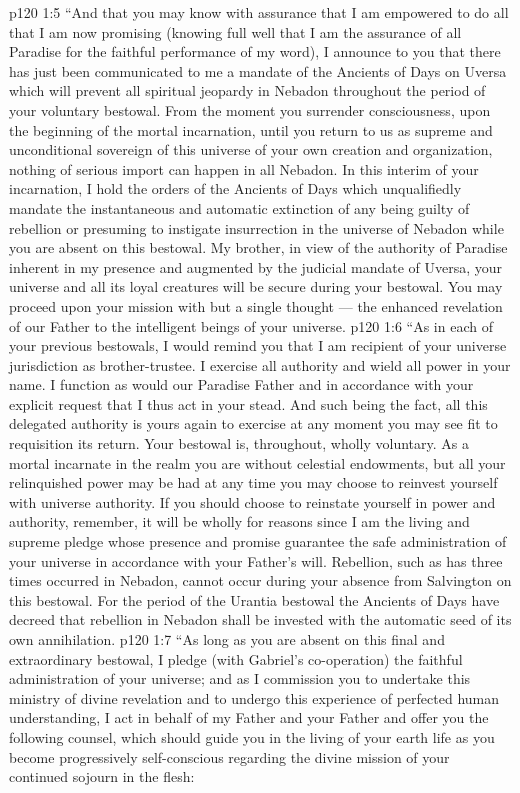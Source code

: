 \vs p120 1:5 “And that you may know with assurance that I am empowered to do all that I am now promising (knowing full well that I am the assurance of all Paradise for the faithful performance of my word), I announce to you that there has just been communicated to me a mandate of the Ancients of Days on Uversa which will prevent all spiritual jeopardy in Nebadon throughout the period of your voluntary bestowal. From the moment you surrender consciousness, upon the beginning of the mortal incarnation, until you return to us as supreme and unconditional sovereign of this universe of your own creation and organization, nothing of serious import can happen in all Nebadon. In this interim of your incarnation, I hold the orders of the Ancients of Days which unqualifiedly mandate the instantaneous and automatic extinction of any being guilty of rebellion or presuming to instigate insurrection in the universe of Nebadon while you are absent on this bestowal. My brother, in view of the authority of Paradise inherent in my presence and augmented by the judicial mandate of Uversa, your universe and all its loyal creatures will be secure during your bestowal. You may proceed upon your mission with but a single thought --- the enhanced revelation of our Father to the intelligent beings of your universe.
\vs p120 1:6 “As in each of your previous bestowals, I would remind you that I am recipient of your universe jurisdiction as brother\hyp{}trustee. I exercise all authority and wield all power in your name. I function as would our Paradise Father and in accordance with your explicit request that I thus act in your stead. And such being the fact, all this delegated authority is yours again to exercise at any moment you may see fit to requisition its return. Your bestowal is, throughout, wholly voluntary. As a mortal incarnate in the realm you are without celestial endowments, but all your relinquished power may be had at any time you may choose to reinvest yourself with universe authority. If you should choose to reinstate yourself in power and authority, remember, it will be wholly for  reasons since I am the living and supreme pledge whose presence and promise guarantee the safe administration of your universe in accordance with your Father’s will. Rebellion, such as has three times occurred in Nebadon, cannot occur during your absence from Salvington on this bestowal. For the period of the Urantia bestowal the Ancients of Days have decreed that rebellion in Nebadon shall be invested with the automatic seed of its own annihilation.
\vs p120 1:7 “As long as you are absent on this final and extraordinary bestowal, I pledge (with Gabriel’s co\hyp{}operation) the faithful administration of your universe; and as I commission you to undertake this ministry of divine revelation and to undergo this experience of perfected human understanding, I act in behalf of my Father and your Father and offer you the following counsel, which should guide you in the living of your earth life as you become progressively self\hyp{}conscious regarding the divine mission of your continued sojourn in the flesh:
